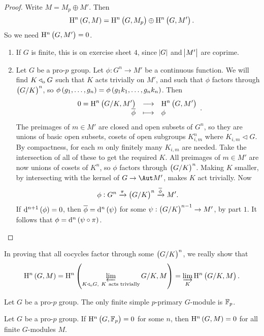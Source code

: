 \begin{proof}
Write $ M = M_p \oplus M' $. Then
$$ \H^n\br{G, M} = \H^n\br{G, M_p} \oplus \H^n\br{G, M'}. $$
So we need $ \H^n\br{G, M'} = 0 $.
\begin{enumerate}[leftmargin=0.5in, label=Part \arabic*.]
\item If $ G $ is finite, this is on exercise sheet $ 4 $, since $ \abs{G} $ and $ \abs{M'} $ are coprime.
\item Let $ G $ be a pro-$ p $ group. Let $ \phi : G^n \to M' $ be a continuous function. We will find $ K \triangleleft_{\mathrm{o}} G $ such that $ K $ acts trivially on $ M' $, and such that $ \phi $ factors through $ \br{G / K}^n $, so $ \phi\br{g_1, \dots, g_n} = \phi\br{g_1k_1, \dots, g_nk_n} $. Then
$$ \function{0 = \H^n\br{G / K, M'}}{\H^n\br{G, M'}}{\overline{\phi}}{\phi}. $$
The preimages of $ m \in M' $ are closed and open subsets of $ G^n $, so they are unions of basic open subsets, cosets of open subgroups $ K_{i, m}^n $ where $ K_{i, m} \triangleleft G $. By compactness, for each $ m $ only finitely many $ K_{i, m} $ are needed. Take the intersection of all of these to get the required $ K $. All preimages of $ m \in M' $ are now unions of cosets of $ K^n $, so $ \phi $ factors through $ \br{G / K}^n $. Making $ K $ smaller, by intersecting with the kernel of $ G \to \Aut M' $, makes $ K $ act trivially. Now
$$ \phi : G^n \xrightarrow{\pi} \br{G / K}^n \xrightarrow{\overline{\phi}} M'. $$
If $ \d^{n + 1}\br{\phi} = 0 $, then $ \overline{\phi} = \d^n\br{\psi} $ for some $ \psi : \br{G / K}^{n - 1} \to M' $, by part $ 1 $. It follows that $ \phi = \d^n\br{\psi \circ \pi} $.
\end{enumerate}
\end{proof}

\begin{remark}
In proving that all cocycles factor through some $ \br{G / K}^n $, we really show that
$$ \H^n\br{G, M} = \H^n\br{\varprojlim_{K \triangleleft_\o G, \ K \ \text{acts trivially}} G / K, M} = \varinjlim_K \H^n\br{G / K, M}. $$
\end{remark}

\pagebreak

\begin{proposition}
Let $ G $ be a pro-$ p $ group. The only finite simple $ p $-primary $ G $-module is $ \mathbb{F}_p $.
\end{proposition}

\begin{proposition}
Let $ G $ be a pro-$ p $ group. If $ \H^n\br{G, \FF_p} = 0 $ for some $ n $, then $ \H^n\br{G, M} = 0 $ for all finite $ G $-modules $ M $.
\end{proposition}

